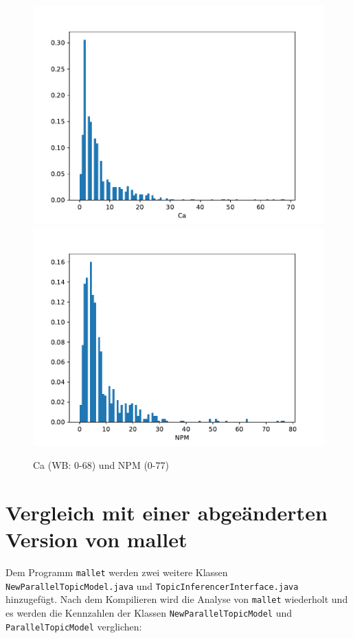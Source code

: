 \documentclass{scrreprt}
\newcommand{\lstx}[1]{\lstinline$#1$}
\begin{document}

\begin{figure}
 \includegraphics[width=.45\textwidth]{./Ca.pdf}
  \includegraphics[width=.45\textwidth]{./NPM.pdf}
 \caption{Ca (WB: 0-68) und NPM (0-77)}
 \label{abb:ca_npm}
\end{figure}

\pagebreak

\section{Vergleich mit einer abgeänderten Version von mallet}

Dem Programm \lstx{mallet} werden zwei weitere Klassen \lstx{NewParallelTopicModel.java} und \lstx{TopicInferencerInterface.java} hinzugefügt. Nach dem Kompilieren wird die Analyse von \lstx{mallet} wiederholt und es werden die Kennzahlen der Klassen \lstx{NewParallelTopicModel} und \lstx{ParallelTopicModel} verglichen:

\end{document}
